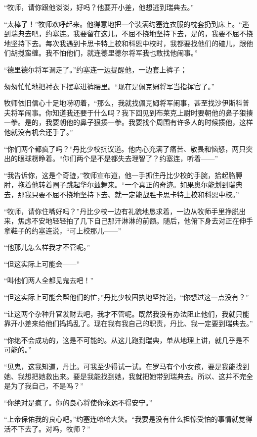     “牧师，请你跟他谈谈，好吗？他要开小差，他想逃到瑞典去。”

    “太棒了！”牧师欢呼起来。他得意地把一个装满约塞连衣服的枕套扔到床上。“逃到瑞典去吧，约塞连。我要留在这儿，不屈不挠地坚持下去，是的，我要不屈不挠地坚持下去。每次我遇到卡思卡特上校和科恩中校时，我都要找他们的碴儿，跟他们胡搅蛮缠。我不怕他们，就连德里德尔将军我也敢找他闹事。”

    “德里德尔将军调走了。”约塞连一边提醒他，一边套上裤子；

    匆匆忙忙地把衬衣下摆塞进裤腰里。“现在是佩克姆将军当指挥官了。”

    牧师依旧信心十足地唠叨着，“那么，我就找佩克姆将军闹事，甚至找沙伊斯科普夫将军闹事。你知道我还要于什么吗？我下回见到布莱克上尉时要朝他的鼻子狠揍一拳。是的，我要朝他的鼻子狠揍一拳。我要找个周围有许多人的时候揍他，这样他就没有机会还手了。”

    “你们两个都疯了吗？”丹比少校抗议道。他内心充满了痛苦、敬畏和恼怒，两只突出的眼球楞睁着。“你们两个是不是都失去理智了？约塞连，听着——”
 


    “我告诉你，这是个奇迹，”牧师宣布道，他一手抓住丹比少校的手腕，拾起胳膊肘，拖着他转着圈子跳起华尔兹舞来。“一个真正的奇迹。如果奥尔能划到瑞典去，那我只要不屈不挠地坚持下去、就一定能战胜卡思卡特上校和科恩中校。”

    “牧师，请你住嘴好吗？”丹比少校一边有礼貌地恳求着，一边从牧师手里挣脱出来，焦虑不安地轻轻拍了几下自己那汗淋淋的前额。随后，他俯下身去对正在伸手拿鞋子的约塞连说，“可上校那儿——”

    “他那儿怎么样我才不管呢。”

    “但这实际上可能会——”

    “叫他们两人全都见鬼去吧！”

    “但这实际上可能会帮他们的忙，”丹比少校固执地坚持道，“你想过这一点没有？”

    “让这两个杂种升官发财去吧，我才不管呢。既然我没有办法阻止他们，我就只能靠开小差来给他们捣捣乱了。现在我有我自己的职责，丹比、我一定要到瑞典去。”

    “你绝不会成功的，这是不可能的。从这儿跑到瑞典，单从地理上讲，就几乎是不可能的。”

    “见鬼，这我知道，丹比。可我至少得试一试。在罗马有个小女孩，要是我能找到她、我想把她救出来。要是我能找到她，我就把她带到瑞典去。所以、这并不完全是为了我自己，不是吗？”

    “你绝对是疯了。你的良心将使你永远不得安宁。”

    “上帝保佑我的良心吧。”约塞连哈哈大笑。“我要是没有什么担惊受怕的事情就觉得活不下去了。对吗，牧师？”

